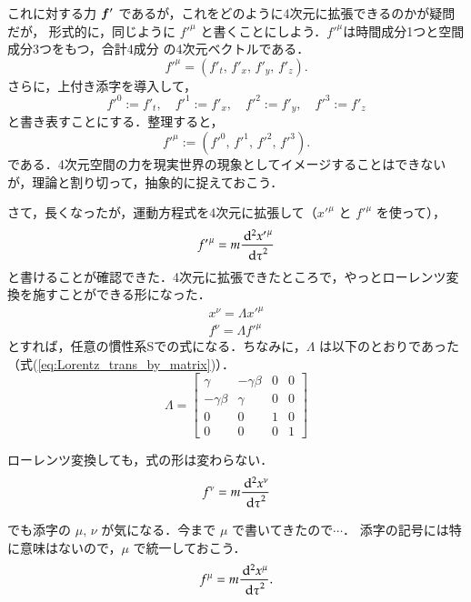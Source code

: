     これに対する力 $\boldsymbol{f}'$ であるが，これをどのように4次元に拡張できるのかが疑問だが，
    形式的に，同じように ${f'}^{\mu}$ と書くことにしよう．${f'}^{\mu}$は時間成分1つと空間成分3つをもつ，合計4成分
    の4次元ベクトルである．
        \[
            {f'}^{\mu} = ({f'}_{t},\,{f'}_{x},\,{f'}_{y},\,{f'}_{z}).
        \]
    さらに，上付き添字を導入して，
        \[
            {f'}^{0} := {f'}_{t}, \quad {f'}^{1} := {f'}_{x}, \quad {f'}^{2} := {f'}_{y}, \quad {f'}^{3}:= {f'}_{z}
        \]
    と書き表すことにする．整理すると，
        \[
            {f'}^{\mu} := ({f'}^{0},\,{f'}^{1},\,{f'}^{2},\,{f'}^{3}).
        \]
    である．4次元空間の力を現実世界の現象としてイメージすることはできないが，理論と割り切って，抽象的に捉えておこう．

    さて，長くなったが，運動方程式を4次元に拡張して（${x'}^{\mu}$ と ${f'}^{\mu}$ を使って），
        \[
            {f'}^{\mu} = m \frac{\,\mathrm{d}^{2} {x'}^{\mu}}{{\,\mathrm{d} \tau}^{2}}
        \]
    と書けることが確認できた．4次元に拡張できたところで，やっとローレンツ変換を施すことができる形になった．
        \begin{align}
            {x}^{\nu} = \Lambda {x'}^{\mu} \\
            {f}^{\nu} = \Lambda {f'}^{\mu}
        \end{align}
    とすれば，任意の慣性系Sでの式になる．ちなみに，$\Lambda$ は以下のとおりであった（式(\ref{eq:Lorentz_trans_by_matrix})）．
        \[
            \Lambda =
            \begin{bmatrix}
                \gamma       & - \gamma \beta & 0 & 0 \\
                - \gamma \beta &   \gamma       & 0 & 0 \\
                0              & 0              & 1 & 0 \\
                0              & 0              & 0 & 1
            \end{bmatrix}
        \]

    ローレンツ変換しても，式の形は変わらない．
    \begin{align*}
        {f}^{\nu} = m \frac{\,\mathrm{d}^{2} {x}^{\nu}}{{\,\mathrm{d} \tau}^{2}}
    \end{align*}

    でも添字の $\mu,\,\nu$ が気になる．今まで $\mu$ で書いてきたので$\cdots$．
    添字の記号には特に意味はないので，$\mu$ で統一しておこう．
    \begin{align*}
        {f}^{\mu} = m \frac{\,\mathrm{d}^{2} {x}^{\mu}}{{\,\mathrm{d} \tau}^{2}}.
    \end{align*}

